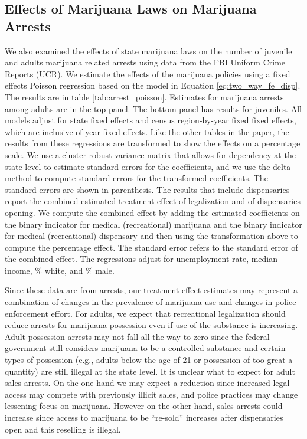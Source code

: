 \documentclass[12pt]{article}%
\begin{document}
\subsection{Effects of Marijuana Laws on Marijuana Arrests}
\label{sec:arrest_results}


We also examined the effects of state marijuana laws on the number of juvenile and adults marijuana related arrests using data from the FBI Uniform Crime Reports (UCR). We estimate the effects of the marijuana policies using a fixed effects Poisson regression based on the model in Equation \ref{eq:two_way_fe_disp}. The results are in table \ref{tab:arrest_poisson}. 
Estimates for marijuana arrests among adults are in the top panel. The bottom panel has results for juveniles. 
All models adjust for state fixed effects and census region-by-year fixed fixed effects, which are inclusive of year fixed-effects. 
Like the other tables in the paper, the results from these  regressions are transformed to show the effects on a percentage scale. 
We use a cluster robust variance matrix that allows for dependency at the state level to estimate standard errors for the coefficients, and we use the delta method to compute standard errors for the transformed coefficients. The standard errors are shown in parenthesis. The results that include dispensaries report the combined estimated treatment effect of legalization and  of dispensaries opening.  We compute the combined effect by adding the estimated coefficients on the binary indicator for medical (recreational) marijuana  and the binary indicator for medical (recreational) dispensary and then using the transformation above to compute the percentage effect. The standard error refers to the standard error of the combined effect. The regressions adjust for unemployment rate, median income, \% white, and \% male.

Since these data are from arrests, our treatment effect estimates may represent a combination of changes in the prevalence of marijuana use and changes in police enforcement effort. 
For adults, we expect that recreational legalization should reduce arrests for marijuana possession even if use of the substance is increasing. 
Adult possession arrests may not fall all the way to zero since the federal government still considers marijuana to be a controlled substance and certain types of possession (e.g., adults below the age of 21 or possession of too great a quantity) are still illegal at the state level. It is unclear what to expect for adult sales arrests.
On the one hand we may expect a reduction since increased legal access may compete with previously illicit sales, and  police practices may change lessening focus on marijuana. 
However on the other hand, sales arrests could increase since access to marijuana to be ``re-sold'' increases after dispensaries open and this reselling is illegal. 
\end{document}
